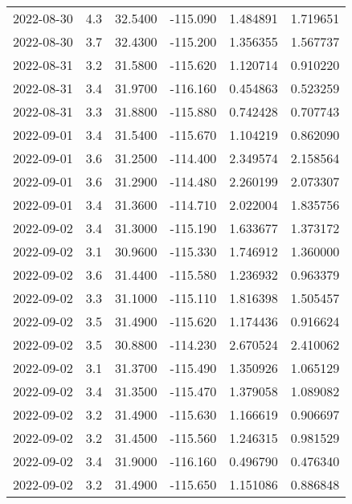 \begin{tabular}{lrrrrr}
2022-08-30 &       4.3 &  32.5400 &  -115.090 &         1.484891 &         1.719651 \\
2022-08-30 &       3.7 &  32.4300 &  -115.200 &         1.356355 &         1.567737 \\
2022-08-31 &       3.2 &  31.5800 &  -115.620 &         1.120714 &         0.910220 \\
2022-08-31 &       3.4 &  31.9700 &  -116.160 &         0.454863 &         0.523259 \\
2022-08-31 &       3.3 &  31.8800 &  -115.880 &         0.742428 &         0.707743 \\
2022-09-01 &       3.4 &  31.5400 &  -115.670 &         1.104219 &         0.862090 \\
2022-09-01 &       3.6 &  31.2500 &  -114.400 &         2.349574 &         2.158564 \\
2022-09-01 &       3.6 &  31.2900 &  -114.480 &         2.260199 &         2.073307 \\
2022-09-01 &       3.4 &  31.3600 &  -114.710 &         2.022004 &         1.835756 \\
2022-09-02 &       3.4 &  31.3000 &  -115.190 &         1.633677 &         1.373172 \\
2022-09-02 &       3.1 &  30.9600 &  -115.330 &         1.746912 &         1.360000 \\
2022-09-02 &       3.6 &  31.4400 &  -115.580 &         1.236932 &         0.963379 \\
2022-09-02 &       3.3 &  31.1000 &  -115.110 &         1.816398 &         1.505457 \\
2022-09-02 &       3.5 &  31.4900 &  -115.620 &         1.174436 &         0.916624 \\
2022-09-02 &       3.5 &  30.8800 &  -114.230 &         2.670524 &         2.410062 \\
2022-09-02 &       3.1 &  31.3700 &  -115.490 &         1.350926 &         1.065129 \\
2022-09-02 &       3.4 &  31.3500 &  -115.470 &         1.379058 &         1.089082 \\
2022-09-02 &       3.2 &  31.4900 &  -115.630 &         1.166619 &         0.906697 \\
2022-09-02 &       3.2 &  31.4500 &  -115.560 &         1.246315 &         0.981529 \\
2022-09-02 &       3.4 &  31.9000 &  -116.160 &         0.496790 &         0.476340 \\
2022-09-02 &       3.2 &  31.4900 &  -115.650 &         1.151086 &         0.886848 \\

\end{tabular}
